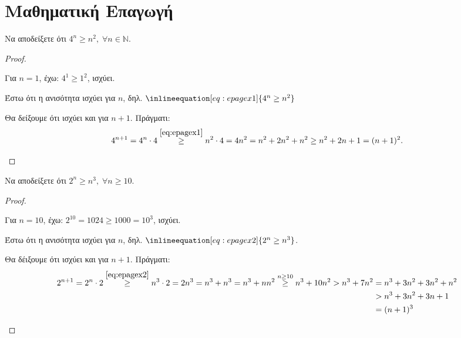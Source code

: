 \documentclass[main.tex]{subfiles}
\begin{document}
\section{Μαθηματική Επαγωγή}


\begin{example}
  Να αποδείξετε ότι $ 4^{n} \geq n^{2}, \; \forall n \in \mathbb{N} $.
\end{example}
\begin{proof}
\item {}
  \begin{myitemize}
    \item Για $ n=1 $, έχω: $ 4^{1} \geq 1^{2} $, ισχύει.
    \item Έστω ότι η ανισότητα ισχύει για $n$, δηλ. 
      $\inlineequation[eq:epagex1]{4^{n} \geq n^{2}}$
    \item Θα δείξουμε ότι ισχύει και για $ n+1 $. Πράγματι:
      \begin{align*}
        4^{n+1} = 4^{n}\cdot 4 \overset{\eqref{eq:epagex1}}{\geq}
        n^{2}\cdot 4 
        = 4n^{2} = n^{2} + 2n^{2} + n^{2} \geq n^{2} + 2n + 1 = (n+1)^{2}.
      \end{align*}
  \end{myitemize}
\end{proof}

\begin{example}
  Να αποδείξετε ότι $ 2^{n} \geq n^{3}, \; \forall n \geq 10 $.
\end{example}
\begin{proof}
\item {}
  \begin{myitemize}
    \item Για $ n=10 $, έχω: $ 2^{10} = 1024 \geq 1000 = 10^{3}  $, 
      ισχύει.
    \item Έστω ότι η ανισότητα ισχύει για $n$, δηλ. 
      $\inlineequation[eq:epagex2]{2^{n} \geq n^{3}}$.
    \item Θα δέιξουμε ότι ισχύει και για $ n+1 $. Πράγματι:
      \begin{align*}
        2^{n+1} = 2^{n} \cdot 2 \overset{\eqref{eq:epagex2}}{\geq} n^{3} 
        \cdot 2 = 2n^{3} = n^{3} + n^{3} = n^{3} + nn^{2} \overset{n\geq 10}
        {\geq} n^{3}+10n^{2} > n^{3}+7n^{2} &= n^{3} + 3n^{2} + 3n^{2} + n^{2} \\ 
                                            &> n^{3} + 3n^{2} + 3n + 1 \\ 
                                            &= (n+1)^{3}
      \end{align*} 
  \end{myitemize}
\end{proof}
\end{document}
